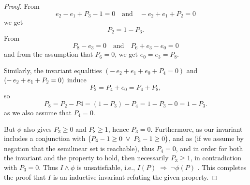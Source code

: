 \begin{proof}
	\noindent
	From
	\[
	e_{2}-e_{1}+P_{3}-1=0
	\quad\text{and}\quad
	-e_{2}+e_{1}+P_{2}=0
	\]
	we get
	\[
	P_{2}=1-P_{3}.
	\]
	From
	\[
	P_{8}-e_{3}=0
	\quad\text{and}\quad
	P_{6}+e_{3}-e_{0}=0
	\]
	and from the assumption that $P_6=0$, we get $e_{0}=e_{3}=P_{8}$.
	
	
	\noindent
	Similarly, the invariant equalities 
	$(-\,e_{2}+e_{1}+e_{0}+P_{4}=0)$ and $(	-\,e_{2}+e_{1}+\textcolor{black}{P_{2}}=0)$
	induce
	\[
	P_{2}=P_{4}+e_{0}=P_{4}+P_{8},
	\]
	so
	\[
	P_{8}=P_2-P4=(1-P_{3})-P_{4}=1-P_{3}-0=1-P_3.
	\]
	as we also assume that $P_4=0$.


	
	
	\noindent
	But $\phi$ also gives $P_{3}\ge0$ and $P_{8}\ge1$, hence $P_{3}=0$.  
	Furthermore, as our invariant includes a conjunction with $\bigl(P_{4}-1\ge0\;\lor\;\textcolor{black}{P_{3}}-1\ge0\bigr)$, and as (if we assume by negation that the semilinear set is reachable), thus $P_4=0$, and in order for both the invariant and the property to hold, then necessarily $P_3 \ge 1$, in contradiction with $P_3=0$.
	  Thus $I\land\phi$ is unsatisfiable, i.e., 
	$
	I(P)\;\Longrightarrow\;\neg\phi(P)$
	.
	This completes the proof that $I$ is an inductive invariant refuting the given property.
\end{proof}


\newpage